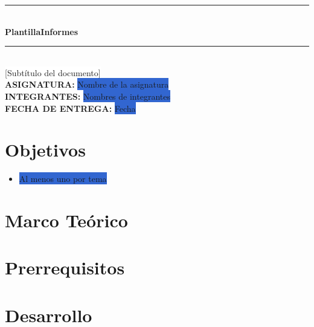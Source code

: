 \documentclass[12pt]{report}
\begin{document}
\thispagestyle{empty}
\vspace*{2cm}
\begin{center}
    \noindent\rule{\textwidth}{0.4pt}\\[0.5cm]
    {\Huge\bfseries PlantillaInformes}\\[0.5cm]
    \noindent\rule{\textwidth}{0.4pt}\\[0.5cm]
    {\large {\colorbox{white}{[Subtítulo del documento]}}}\\[2cm]
    \textbf{ASIGNATURA:} \hspace{1cm} \colorbox{highlight}{Nombre de la asignatura}\\[0.2cm]
    
    \textbf{INTEGRANTES:} \hspace{1cm} \colorbox{highlight}{Nombres de integrantes}\\[2cm]
    
    \textbf{FECHA DE ENTREGA:} \hspace{0.5cm} \colorbox{highlight}{Fecha}
\end{center}
\newpage


\tableofcontents
\thispagestyle{empty}
\newpage

\setcounter{page}{1}

\section*{Objetivos} 
\begin{itemize}
    \item \colorbox{highlight}{Al menos uno por tema}
\end{itemize}

\section*{Marco Teórico}

\section*{Prerrequisitos}

\section*{Desarrollo}
\end{document}
